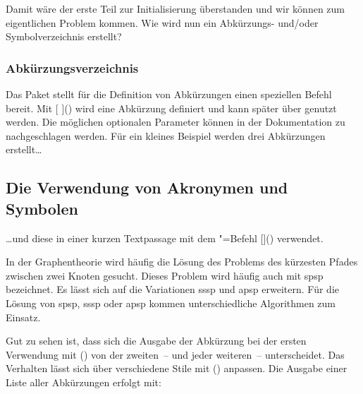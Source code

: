 \documentclass[%
  english,ngerman,%
  cdgeometry=no,DIV=12,automark,%
]{tudscrartcl}
\begin{document}
Damit wäre der erste Teil zur Initialisierung überstanden und wir können zum 
eigentlichen Problem kommen. Wie wird nun ein Abkürzungs- und/oder 
Symbolverzeichnis erstellt?

\subsubsection{Abkürzungsverzeichnis}
Das Paket  stellt für die Definition von Abkürzungen einen 
speziellen Befehl bereit. Mit [%
  \LParameter{}%
]() wird eine Abkürzung definiert und kann später über 
 genutzt werden. Die möglichen optionalen Parameter können in 
der Dokumentation zu  nachgeschlagen werden. Für ein 
kleines Beispiel werden drei Abkürzungen erstellt\dots
%
\begin{Trunk+}
\section{Die Verwendung von Akronymen und Symbolen}
\end{Trunk+}
\begin{Trunk*}

\end{Trunk*}
%
\dots und diese in einer kurzen Textpassage mit dem "=Befehl
[]() verwendet.
%
\begin{Trunk*}
In der Graphentheorie wird häufig die Lösung des Problems des kürzesten
Pfades zwischen zwei Knoten gesucht. Dieses Problem wird häufig auch
mit \gls{spsp} bezeichnet. Es lässt sich auf die Variationen \gls{sssp}
und \gls{apsp} erweitern. Für die Lösung von \gls{spsp}, \gls{sssp} 
oder \gls{apsp} kommen unterschiedliche Algorithmen zum Einsatz.

\end{Trunk*}
%
Gut zu sehen ist, dass sich die Ausgabe der Abkürzung bei der ersten Verwendung 
mit () von der zweiten~-- und jeder weiteren~-- 
unterscheidet. Das Verhalten lässt sich über verschiedene Stile mit 
() anpassen. Die Ausgabe einer Liste 
aller Abkürzungen erfolgt mit:
%
\begin{Hint}
\printacronyms
\end{Hint}
\end{document}
